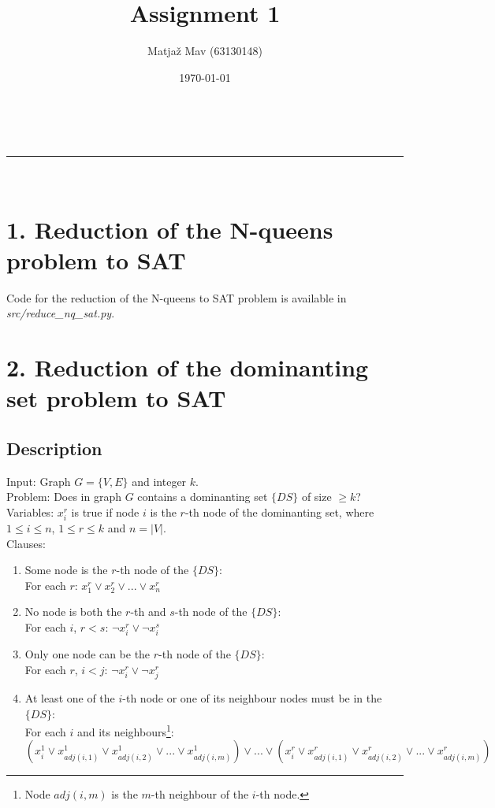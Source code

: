 \documentclass[a4paper,11pt]{article}
\makeatletter
\newcommand{\linia}{\rule{\linewidth}{0.5pt}}
\theoremstyle{mytheor}
\renewcommand{\maketitle}{
\begin{center}
\vspace{2ex}
{\huge \textsc{\@title}}
\vspace{1ex}
\\
\linia\\
\@author \hfill \@date
\vspace{4ex}
\end{center}
}
\makeatother
\begin{document}
\title{Assignment 1}

\author{Matjaž Mav (63130148)}

\date{\today}

\maketitle

\section*{1. Reduction of the N-queens problem to SAT}
Code for the reduction of the N-queens to SAT problem is available in \textit{src/reduce\_nq\_sat.py}.

\section*{2. Reduction of the dominanting set problem to SAT}

\subsection*{Description}

Input: Graph $G = \{V, E\}$ and integer $k$.\\
Problem: Does in graph $G$ contains a dominanting set $\{DS\}$ of size $\geq k$?\\
Variables: $x_i^r$ is true if node $i$ is the $r$-th node of the dominanting set, where $1 \leq i \leq n$, $1 \leq r \leq k$ and $n = |V|$.\\
Clauses:
\begin{enumerate}
  \item Some node is the $r$-th node of the $\{DS\}$:\\
        For each $r$: $x_1^r \lor x_2^r \lor ... \lor x_n^r$
  \item No node is both the $r$-th and $s$-th node of the $\{DS\}$:\\
        For each $i$, $r<s$: $\neg x_i^r \lor \neg x_i^s$
  \item Only one node can be the $r$-th node of the $\{DS\}$:\\
        For each $r$, $i<j$: $\neg x_i^r \lor \neg x_j^r$
  \item At least one of the $i$-th node or one of its neighbour nodes must be in the $\{DS\}$:\\
        For each $i$ and its neighbours\footnote{Node $adj(i, m)$ is the $m$-th neighbour of the $i$-th node.}: $(x_i^1 \lor x_{adj(i, 1)}^1 \lor x_{adj(i, 2)}^1 \lor ... \lor x_{adj(i, m)}^1) \lor ... \lor (x_i^r \lor x_{adj(i, 1)}^r \lor x_{adj(i, 2)}^r \lor ... \lor x_{adj(i, m)}^r)$
\end{enumerate}
\end{document}
